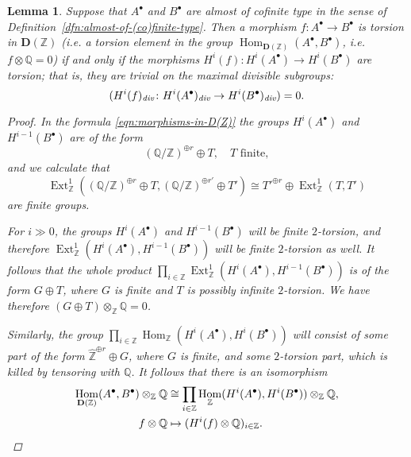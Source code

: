 \documentclass[leqno,12pt]{article}
\theoremstyle{plain}
\newtheorem{lemma}[theorem]{\indent\sc Lemma}
\theoremstyle{definition}
\DeclareMathOperator{\Hom}{Hom}
\DeclareMathOperator{\Ext}{Ext}
\newcommand{\ZZ}{\mathbb{Z}}
\newcommand{\QQ}{\mathbb{Q}}
\renewcommand{\div}{\text{\it div}}
\begin{document}
\begin{lemma}
  \label{lemma:torsion-morphisms-in-D(Z)}
  Suppose that $A^\bullet$ and $B^\bullet$ are almost of cofinite type in the
  sense of Definition~\ref{dfn:almost-of-(co)finite-type}. Then a morphism
  $f\colon A^\bullet\to B^\bullet$ is torsion in $\mathbf{D} (\ZZ)$
  (i.e. a torsion element in the group
  $\Hom_{\mathbf{D} (\ZZ)} (A^\bullet, B^\bullet)$, i.e.
  $f\otimes \mathbb{Q} = 0$) if and only if the morphisms
  $H^i (f)\colon H^i (A^\bullet) \to H^i (B^\bullet)$
  are torsion; that is, they are trivial on the maximal divisible subgroups:
  $$(H^i (f)_\div\colon H^i (A^\bullet)_\div \to H^i (B^\bullet)_\div) = 0.$$

  \begin{proof}
    In the formula \eqref{eqn:morphisms-in-D(Z)} the groups $H^i (A^\bullet)$
    and $H^{i-1} (B^\bullet)$ are of the form
    \[ (\mathbb{Q}/\mathbb{Z})^{\oplus r} \oplus T,
      \quad T\text{ finite}, \]
    and we calculate that
    \[ \Ext_\ZZ^1 ((\QQ/\ZZ)^{\oplus r} \oplus T, (\QQ/\ZZ)^{\oplus r'} \oplus T') \cong
    T'^{\oplus r} \oplus \Ext_\ZZ^1 (T, T') \]
    are finite groups.

    For $i \gg 0$, the groups $H^i (A^\bullet)$ and $H^{i-1} (B^\bullet)$ will
    be finite $2$-torsion, and therefore
    $\Ext_\ZZ^1 (H^i (A^\bullet), H^{i-1} (B^\bullet))$ will be finite
    $2$-torsion as well. It follows that the whole product
    $\prod_{i\in \mathbb{Z}} \Ext_\ZZ^1 (H^i (A^\bullet), H^{i-1} (B^\bullet))$
    is of the form $G \oplus T$, where $G$ is finite and $T$ is possibly
    infinite $2$-torsion. We have therefore $(G \oplus T)\otimes_\ZZ \QQ = 0$.

    Similarly, the group
    $\prod_{i\in\ZZ} \Hom_\ZZ (H^i (A^\bullet), H^i (B^\bullet))$ will consist
    of some part of the form $\widehat{\ZZ}^{\oplus r} \oplus G$, where $G$
    is finite, and some $2$-torsion part, which is killed by tensoring with
    $\QQ$. It follows that there is an isomorphism
    \begin{align*}
      \Hom_{\mathbf{D} (\ZZ)} (A^\bullet, B^\bullet)\otimes_\ZZ \mathbb{Q} & \cong
      \prod_{i\in \mathbb{Z}} \Hom_\ZZ (H^i (A^\bullet), H^i (B^\bullet)) \otimes_\ZZ \mathbb{Q}, \\
      f\otimes\QQ & \mapsto (H^i (f) \otimes \QQ)_{i\in\ZZ}. \qedhere
    \end{align*}
  \end{proof}
\end{lemma}
\end{document}

